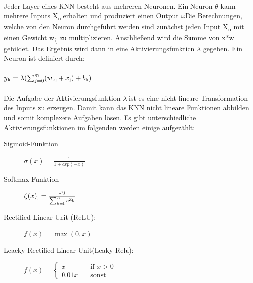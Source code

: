 \documentclass{llncs}
\begin{document}
~\\
Jeder Layer eines KNN besteht aus mehreren Neuronen. Ein Neuron $\theta$ kann mehrere Inputs X\textsubscript{n} erhalten und produziert einen Output $\omega$\. Die Berechnungen, welche von den Neuron durchgeführt werden sind zunächst jeden Input X\textsubscript{n} mit einen Gewicht w\textsubscript{ij} zu multiplizieren. Anschließend wird die Summe von x*w gebildet. Das Ergebnis wird dann in eine Aktivierungsfunktion $\lambda$ gegeben. Ein Neuron ist definiert durch:
\\\\
\begin{math}
y\textsubscript{k} = \lambda(\sum_{j=0}^{m}(w\textsubscript{kj}+x\textsubscript{j})+b\textsubscript{k})                
\end{math}
\\\\
Die Aufgabe der Aktivierungsfunktion $\lambda$  ist es eine nicht lineare Transformation des Inputs zu erzeugen. Damit kann das KNN nicht lineare Funktionen abbilden und somit komplexere Aufgaben lösen. Es gibt unterschiedliche Aktivierungsfunktionen im folgenden werden einige aufgezählt:
\vspace{5 mm}
\begin{description}
	\item[Sigmoid-Funktion]		
	
	\begin{math}
	\sigma(x)=\frac{1}{1+exp(-x)}
	\end{math}
	\vspace{5 mm}
	\item[Softmax-Funktion]
	
	\begin{math}
	\zeta(x)\textsubscript{j} = \frac{e\textsuperscript{x\textsubscript{j}}}{\sum_{k=1}^{K}e\textsuperscript{x\textsubscript{k}}}
	\end{math}
	\vspace{5 mm}
	\item[Rectified Linear Unit (ReLU):]
	
	\begin{math}
	f(x)=\max(0,x) 
	\end{math}
	\vspace{5 mm}
	\item[Leacky Rectified Linear Unit(Leaky Relu):]
	
	\begin{math}
	f(x) = \begin{cases}
	x  	 & \quad \text{if } x > 0\\
	0.01x & \quad \text{sonst} 
	\end{cases}
	\end{math}
	\vspace{5 mm}
\end{description}
\end{document}
